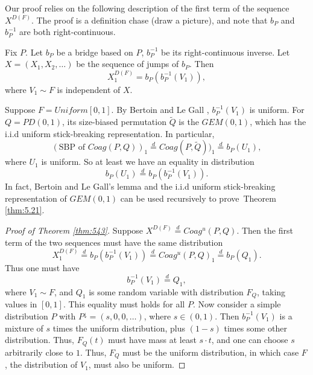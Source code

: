 Our proof relies on the following description of the first term of the sequence $X^{D(F)}$. The proof is a definition chase (draw a picture), and note that $b_P$ and $b_P^{-1}$ are both right-continuous. 

\begin{lemma}
Fix $P$. Let $b_P$ be a bridge based on $P$, $b_P^{-1}$ be its right-continuous inverse. Let $X = (X_1, X_2, \ldots)$ be the sequence of jumps of $b_P$. Then 
\begin{equation}\label{eqn:df1}
X^{D(F)}_1 = b_P(b_P^{-1}(V_1)),
\end{equation}
where $V_1 \sim F$ is independent of $X$. %
\end{lemma}

\begin{example}
Suppose $F = Uniform[0,1]$. By Bertoin and Le Gall \cite{bertoin44}, $b_P^{-1}(V_1)$ is uniform. For $Q = PD(0,1)$, its size-biased permutation $\tilde{Q}$ is the $GEM(0,1)$, which has the i.i.d uniform stick-breaking representation. In particular, 
$$ (\mbox{SBP of } Coag(P,Q))_1 \stackrel{d}{=} Coag(P,\tilde{Q}))_1 \stackrel{d}{=} b_P(U_1), $$
where $U_1$ is uniform. So at least we have an equality in distribution
$$ b_P(U_1) \stackrel{d}{=} b_P(b_P^{-1}(V_1)). $$
In fact, Bertoin and Le Gall's lemma and the i.i.d uniform stick-breaking representation of $GEM(0,1)$ can be used recursively to prove~Theorem \ref{thm:5.21}.
\end{example}

\begin{proof}[Proof of Theorem \ref{thm:543}] 
Suppose $X^{D(F)} \stackrel{d}{=} Coag^u(P, Q)$. Then the first term of the two sequences must have the same distribution
$$X^{D(F)}_1 \stackrel{d}{=} b_P(b_P^{-1}(V_1)) \stackrel{d}{=} Coag^u(P, Q)_1 \stackrel{d}{=} b_P(Q_1).$$ 
Thus one must have 
$$b_P^{-1}(V_1) \stackrel{d}{=} Q_1,$$ 
where $V_1 \sim F$, and $Q_1$ is some random variable with distribution $F_Q$, taking values in $[0,1]$. This equality must holds for all $P$. Now consider a simple distribution $P$ with $P^\downarrow = (s, 0, 0, \ldots)$, where $s \in (0,1)$. Then $b_P^{-1}(V_1)$ is a mixture of $s$ times the uniform distribution, plus $(1-s)$ times some other distribution. Thus, $F_Q(t)$ must have mass at least $s \cdot t$, and one can choose $s$ arbitrarily close to $1$. Thus, $F_Q$ must be the uniform distribution, in which case $F$, the distribution of $V_1$, must also be uniform. 
\end{proof}





